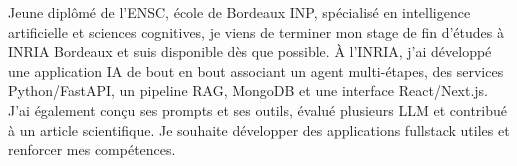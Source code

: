 
\begin{cvparagraph}
Jeune diplômé de l’ENSC, école de Bordeaux INP, spécialisé en intelligence artificielle et sciences cognitives, je viens de terminer mon stage de fin d’études à INRIA Bordeaux et suis disponible dès que possible. À l’INRIA, j’ai développé une application IA de bout en bout associant un agent multi-étapes, des services Python/FastAPI, un pipeline RAG, MongoDB et une interface React/Next.js. J’ai également conçu ses prompts et ses outils, évalué plusieurs LLM et contribué à un article scientifique. Je souhaite développer des applications fullstack utiles et renforcer mes compétences.
\end{cvparagraph}
